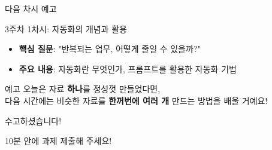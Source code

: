 \documentclass[aspectratio=169, 11pt]{beamer}
\begin{document}
\begin{frame}{다음 차시 예고}
\begin{block}{3주차 1차시: 자동화의 개념과 활용}
\begin{itemize}
  \item \textbf{핵심 질문}: "반복되는 업무, 어떻게 줄일 수 있을까?"
  \item \textbf{주요 내용}: 자동화란 무엇인가, 프롬프트를 활용한 자동화 기법
\end{itemize}
\end{block}

\vspace{0.5cm}

\begin{exampleblock}{ 예고}
\centering
오늘은 자료 \textbf{하나}를 정성껏 만들었다면,\\
다음 시간에는 비슷한 자료를 \textbf{한꺼번에 여러 개} 만드는 방법을 배울 거예요!
\end{exampleblock}
\end{frame}

\begin{frame}
\begin{center}
\Huge
수고하셨습니다!

\vspace{1cm}

\Large
{} 10분 안에 과제 제출해 주세요!
\end{center}
\end{frame}
\end{document}

